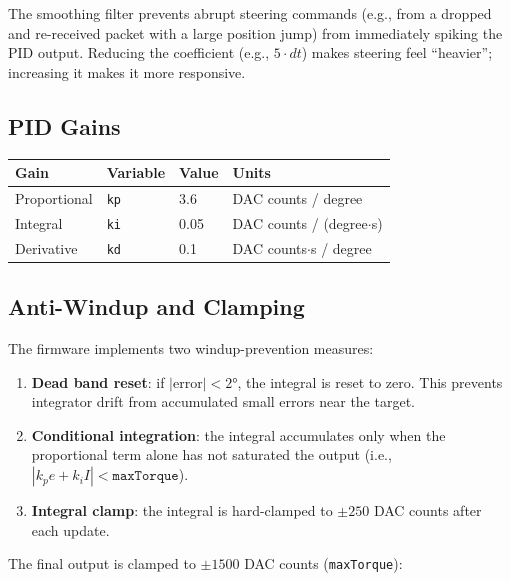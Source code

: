 \documentclass[12pt, letterpaper]{article}
\begin{document}
\begin{notebox}
The smoothing filter prevents abrupt steering commands (e.g., from a dropped and
re-received packet with a large position jump) from immediately spiking the PID
output.  Reducing the coefficient (e.g., $5 \cdot dt$) makes steering feel
``heavier''; increasing it makes it more responsive.
\end{notebox}

\subsection{PID Gains}

\begin{center}
\begin{tabular}{llll}
  \toprule
  \textbf{Gain} & \textbf{Variable} & \textbf{Value} & \textbf{Units} \\
  \midrule
  Proportional & \texttt{kp} & 3.6  & DAC counts / degree \\
  Integral     & \texttt{ki} & 0.05 & DAC counts / (degree$\cdot$s) \\
  Derivative   & \texttt{kd} & 0.1  & DAC counts$\cdot$s / degree \\
  \bottomrule
\end{tabular}
\end{center}

\subsection{Anti-Windup and Clamping}

The firmware implements two windup-prevention measures:

\begin{enumerate}
  \item \textbf{Dead band reset}: if $|\text{error}| < 2°$, the integral is reset
        to zero.  This prevents integrator drift from accumulated small errors near
        the target.
  \item \textbf{Conditional integration}: the integral accumulates only when the
        proportional term alone has not saturated the output (i.e.,
        $|k_p e + k_i I| < \texttt{maxTorque}$).
  \item \textbf{Integral clamp}: the integral is hard-clamped to $\pm250$
        DAC counts after each update.
\end{enumerate}

The final output is clamped to $\pm1500$ DAC counts (\texttt{maxTorque}):
\end{document}
